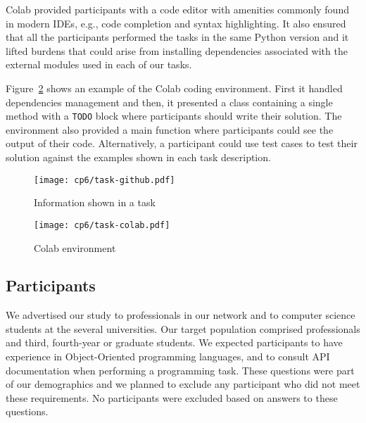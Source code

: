 Colab provided participants with a code editor with amenities commonly found in modern IDEs, e.g., code completion and syntax highlighting. It also ensured that all the participants 
performed the tasks in the same Python version and it lifted 
burdens that could arise from installing dependencies associated with the external modules used in each of our tasks. 


Figure~\ref{fig:nytimes-task-colab} shows an example of the Colab coding environment. 
First it handled dependencies management and then, 
it presented a class containing a single method with a \texttt{TODO} block where 
participants should write their solution. 
The environment also provided a main function where participants could see the output
of their code. Alternatively, a participant could use test cases to test their solution
against the examples shown in each task description.



\clearpage

\begin{figure}
    \centering
    \texttt{[image: cp6/task-github.pdf]}
    \caption{Information shown in a task}
    \label{fig:nytimes-task-github}
\end{figure}



\clearpage

\begin{figure}
    \centering
    \texttt{[image: cp6/task-colab.pdf]}
    \caption{Colab environment}
    \label{fig:nytimes-task-colab}
\end{figure}



\clearpage



\subsection{Participants}
\label{cp6:participants}


We advertised our study to professionals in our network and to computer science students at the several universities. 
Our target population comprised professionals and third, fourth-year or graduate students.
We expected participants to have experience in Object-Oriented programming languages, and to consult API documentation when performing a programming task. These questions were part of our demographics and we planned to exclude any participant
who did not meet these requirements. No participants were excluded
based on answers to these questions.




